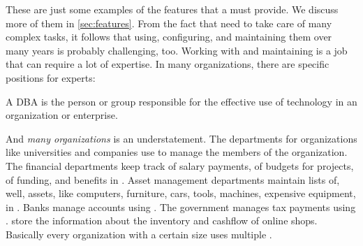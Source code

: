 These are just some examples of the features that a  must provide.
We discuss more of them in \cref{sec:features}.
From the fact that  need to take care of many complex tasks, it follows that using, configuring, and maintaining them over many years is probably challenging, too.
Working with and maintaining  is a job that can require a lot of expertise.
In many organizations, there are specific positions for  experts:%
%
\begin{definition}
A \acrfull{DBA} is the person or group responsible for the effective use of  technology in an organization or enterprise.
\end{definition}%
%
And \emph{many organizations} is an understatement.
The  departments for organizations like universities and companies use  to manage the members of the organization.
The financial departments keep track of salary payments, of budgets for projects, of funding, and benefits in .
Asset management departments maintain lists of, well, assets, like computers, furniture, cars, tools, machines, expensive equipment, in .
Banks manage accounts using .
The government manages tax payments using .
 store the information about the inventory and cashflow of online shops.
Basically every organization with a certain size uses multiple .%
%
%
%
%
%
\endhsection\endhsection%
%
